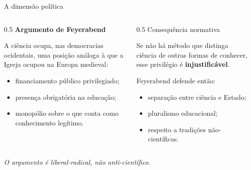 \documentclass[aspectratio=169]{beamer}
\newcommand{\impt}[1]{\textcolor{maccent}{\textbf{#1}}}
\newcommand{\ntc}[1]{\textcolor{mprimary}{#1}}
\begin{document}
\begin{frame}{A dimens\~ao pol\'itica}
\begin{columns}[T]
\begin{column}{0.5\textwidth}
\impt{Argumento de Feyerabend}

\vspace{0.2cm}
A ci\^encia ocupa, nas democracias ocidentais, uma posi\c c\~ao an\'aloga \`a que a Igreja ocupou na Europa medieval:

\vspace{0.15cm}
\begin{itemize}
    \item financiamento p\'ublico privilegiado;
    \item presen\c ca obrigat\'oria na educa\c c\~ao;
    \item monop\'olio sobre o que conta como conhecimento leg\'itimo.
\end{itemize}
\end{column}
\begin{column}{0.5\textwidth}
\ntc{Consequ\^encia normativa}

\vspace{0.2cm}
Se n\~ao h\'a m\'etodo que distinga ci\^encia de outras formas de conhecer, esse privil\'egio \'e \impt{injustific\'avel}.

\vspace{0.2cm}
Feyerabend defende ent\~ao:
\begin{itemize}
    \item separa\c c\~ao entre ci\^encia e Estado;
    \item pluralismo educacional;
    \item respeito a tradi\c c\~oes n\~ao-cient\'ificas.
\end{itemize}
\end{column}
\end{columns}
\vspace{0.4cm}
\begin{center}
\itshape O argumento \'e \emph{liberal-radical}, n\~ao anti-cient\'ifico.
\end{center}
\end{frame}
\end{document}
